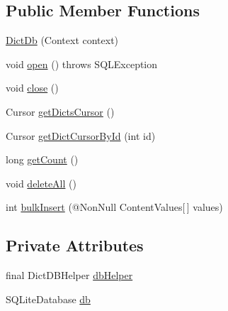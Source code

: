 \subsection*{Public Member Functions}
\begin{DoxyCompactItemize}
\item 
\hyperlink{classorg_1_1buildmlearn_1_1toolkit_1_1dictationtemplate_1_1data_1_1DictDb_af3af1061a044194d543671cbb9ac2e10}{Dict\+Db} (Context context)
\item 
void \hyperlink{classorg_1_1buildmlearn_1_1toolkit_1_1dictationtemplate_1_1data_1_1DictDb_ac4b286b79085e85a55cea53b07f4e866}{open} ()  throws S\+Q\+L\+Exception 
\item 
void \hyperlink{classorg_1_1buildmlearn_1_1toolkit_1_1dictationtemplate_1_1data_1_1DictDb_a3a21b0135857cd720ab100b9bca0fb5c}{close} ()
\item 
Cursor \hyperlink{classorg_1_1buildmlearn_1_1toolkit_1_1dictationtemplate_1_1data_1_1DictDb_a404a2712429cd2b47e293e4346009f7c}{get\+Dicts\+Cursor} ()
\item 
Cursor \hyperlink{classorg_1_1buildmlearn_1_1toolkit_1_1dictationtemplate_1_1data_1_1DictDb_a14ecf3aeacaf3ed8d47d03b8bea595a5}{get\+Dict\+Cursor\+By\+Id} (int id)
\item 
long \hyperlink{classorg_1_1buildmlearn_1_1toolkit_1_1dictationtemplate_1_1data_1_1DictDb_a42292828a2e419b6b57194aa55bd3931}{get\+Count} ()
\item 
void \hyperlink{classorg_1_1buildmlearn_1_1toolkit_1_1dictationtemplate_1_1data_1_1DictDb_a6cf1d99f3846638412f9ebb6b156656f}{delete\+All} ()
\item 
int \hyperlink{classorg_1_1buildmlearn_1_1toolkit_1_1dictationtemplate_1_1data_1_1DictDb_a194456cb4dfed68e5456a4ffc44de606}{bulk\+Insert} (@Non\+Null Content\+Values\mbox{[}$\,$\mbox{]} values)
\end{DoxyCompactItemize}
\subsection*{Private Attributes}
\begin{DoxyCompactItemize}
\item 
final Dict\+D\+B\+Helper \hyperlink{classorg_1_1buildmlearn_1_1toolkit_1_1dictationtemplate_1_1data_1_1DictDb_aa1fc68089b8e66689f73307128f506e9}{db\+Helper}
\item 
S\+Q\+Lite\+Database \hyperlink{classorg_1_1buildmlearn_1_1toolkit_1_1dictationtemplate_1_1data_1_1DictDb_af23d894f99b05df335fe0c72297ce03c}{db}
\end{DoxyCompactItemize}
